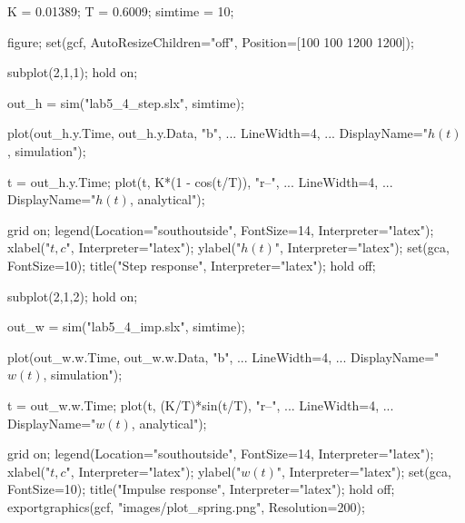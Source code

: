 \begin{matlabcode}
K = 0.01389;
T = 0.6009;
simtime = 10;

figure;
set(gcf, AutoResizeChildren="off", Position=[100 100 1200 1200]);

subplot(2,1,1);
hold on;

out_h = sim("lab5_4_step.slx", simtime);

plot(out_h.y.Time, out_h.y.Data, "b", ...
     LineWidth=4, ...
     DisplayName="$h(t)$, simulation");

t = out_h.y.Time;
plot(t, K*(1 - cos(t/T)), "r--", ...
     LineWidth=4, ...
     DisplayName="$h(t)$, analytical");

grid on;
legend(Location="southoutside", FontSize=14, Interpreter="latex");
xlabel("$t, c$", Interpreter="latex");
ylabel("$h(t)$", Interpreter="latex");
set(gca, FontSize=10);
title("Step response", Interpreter="latex");
hold off;

subplot(2,1,2);
hold on;

out_w = sim("lab5_4_imp.slx", simtime);

plot(out_w.w.Time, out_w.w.Data, "b", ...
     LineWidth=4, ...
     DisplayName="$w(t)$, simulation");

t = out_w.w.Time;
plot(t, (K/T)*sin(t/T), "r--", ...
     LineWidth=4, ...
     DisplayName="$w(t)$, analytical");

grid on;
legend(Location="southoutside", FontSize=14, Interpreter="latex");
xlabel("$t, c$", Interpreter="latex");
ylabel("$w(t)$", Interpreter="latex");
set(gca, FontSize=10);
title("Impulse response", Interpreter="latex");
hold off;
exportgraphics(gcf, "images/plot_spring.png", Resolution=200);
\end{matlabcode}


